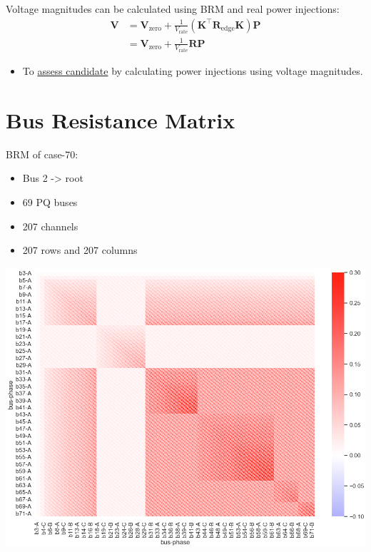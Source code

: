 \documentclass[
]{book}
\providecommand{\tightlist}{%
  \setlength{\itemsep}{0pt}\setlength{\parskip}{0pt}}
\begin{document}
Voltage magnitudes can be calculated using BRM and real power injections:
\[ \begin{aligned}
  \boldsymbol{V} &= \boldsymbol{V}_\text{zero} + \frac{1}{V_\text{rate}}
    \left(
      \boldsymbol{K}^{\top} \boldsymbol{R}_\text{edge} \boldsymbol{K}
    \right) \boldsymbol{P} \\
  {} &= \boldsymbol{V}_\text{zero}
      + \frac{1}{V_\text{rate}} \boldsymbol{R} \boldsymbol{P}
\end{aligned} \]

\begin{itemize}
\tightlist
\item
  To \protect\hyperlink{assessment}{assess candidate} by calculating power injections using
  voltage magnitudes.
\end{itemize}

\hypertarget{BRM}{%
\section{Bus Resistance Matrix}\label{BRM}}

BRM of case-70:

\begin{itemize}
\tightlist
\item
  Bus 2 -\textgreater{} root
\item
  69 PQ buses
\item
  207 channels
\item
  207 rows and 207 columns
\end{itemize}

\begin{center}\includegraphics{Pictures/figHeatmapBRM} \end{center}
\end{document}
